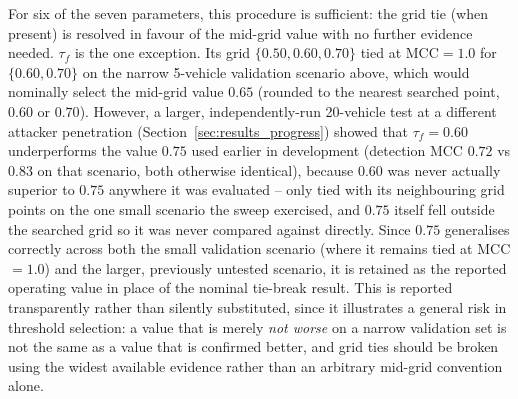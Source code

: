 \documentclass[12pt, a4paper]{report}
\begin{document}
For six of the seven parameters, this procedure is sufficient: the grid tie
(when present) is resolved in favour of the mid-grid value with no further
evidence needed. $\tau_f$ is the one exception. Its grid
$\{0.50,0.60,0.70\}$ tied at MCC$=1.0$ for $\{0.60,0.70\}$ on the narrow
5-vehicle validation scenario above, which would nominally select the
mid-grid value $0.65$ (rounded to the nearest searched point, $0.60$
or $0.70$). However, a larger, independently-run 20-vehicle test at a
different attacker penetration (Section~\ref{sec:results_progress}) showed
that $\tau_f=0.60$ underperforms the value $0.75$ used earlier in
development (detection MCC $0.72$ vs $0.83$ on that scenario, both
otherwise identical), because $0.60$ was never actually superior to
$0.75$ anywhere it was evaluated -- only tied with its neighbouring grid
points on the one small scenario the sweep exercised, and $0.75$ itself
fell outside the searched grid so it was never compared against directly.
Since $0.75$ generalises correctly across both the small validation
scenario (where it remains tied at MCC$=1.0$) and the larger, previously
untested scenario, it is retained as the reported operating value in place
of the nominal tie-break result. This is reported transparently rather
than silently substituted, since it illustrates a general risk in
threshold selection: a value that is merely \emph{not worse} on a narrow
validation set is not the same as a value that is confirmed better, and
grid ties should be broken using the widest available evidence rather than
an arbitrary mid-grid convention alone.
\end{document}
